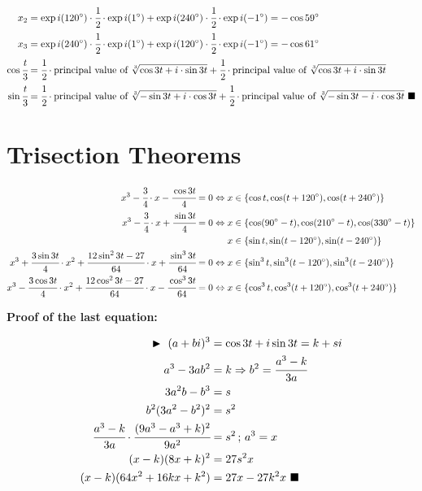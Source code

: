 \documentclass[11pt,a4paper]{article}
\begin{document}
\begin{align}
x_2 &= \exp i (120\degree) \cdot \cfrac{1}{2} \cdot \exp i (1\degree) + \exp i (240\degree) \cdot \cfrac{1}{2} \cdot \exp i (-1\degree) = - \cos 59\degree \\
x_3 &= \exp i (240\degree) \cdot \cfrac{1}{2} \cdot \exp i (1\degree) + \exp i (120\degree) \cdot \cfrac{1}{2} \cdot \exp i (-1\degree) = - \cos 61\degree \\
\cos \cfrac{t}{3} &= \cfrac{1}{2} \cdot \text{principal value of } \sqrt[3]{\cos 3t + i \cdot \sin 3t} + \cfrac{1}{2} \cdot \text{principal value of } \sqrt[3]{\cos 3t + i \cdot \sin 3t} \\
\sin \cfrac{t}{3} &= \cfrac{1}{2} \cdot \text{principal value of } \sqrt[3]{- \sin 3t + i \cdot \cos 3t} + \cfrac{1}{2} \cdot \text{principal value of } \sqrt[3]{- \sin 3t - i \cdot \cos 3t} \,\,\blacksquare
\end{align}

\vspace{3mm}

\section{Trisection Theorems}

\begin{align}
x^3 - \cfrac{3}{4} \cdot x - \cfrac{\cos 3t}{4} = 0 \Leftrightarrow x &\in \{ \cos t, \cos (t + 120\degree), \cos (t + 240\degree) \} \\
x^3 - \cfrac{3}{4} \cdot x + \cfrac{\sin 3t}{4} = 0 \Leftrightarrow x &\in \{ \cos (90\degree - t), \cos (210\degree - t), \cos (330\degree - t) \} \\
x &\in \{ \sin t, \sin (t - 120\degree), \sin (t - 240\degree) \} \\
x^3 + \cfrac{3 \sin 3t}{4} \cdot x^2 + \cfrac{12 \sin^2 3t - 27}{64} \cdot x + \cfrac{\sin^3 3t}{64} = 0 \Leftrightarrow x &\in \{ \sin^3 t, \sin^3 (t - 120\degree), \sin^3 (t - 240\degree) \} \\
x^3 - \cfrac{3 \cos 3t}{4} \cdot x^2 + \cfrac{12 \cos^2 3t - 27}{64} \cdot x - \cfrac{\cos^3 3t}{64} = 0 \Leftrightarrow x &\in \{ \cos^3 t, \cos^3 (t + 120\degree), \cos^3 (t + 240\degree) \}
\end{align}

\vspace{100mm}

\textbf{Proof of the last equation: }

\begin{align}
\blacktriangleright\,\,(a + bi)^3 &= \cos 3t + i \sin 3t = k + si \\
a^3 - 3ab^2 &= k \Rightarrow b^2 = \cfrac{a^3 - k}{3a} \\
3a^2b - b^3 &= s \\
b^2(3a^2 -b^2)^2 &= s^2 \\
\cfrac{a^3 - k}{3a} \cdot \cfrac{(9a^3 - a^3 + k)^2}{9a^2} &= s^2\,;\,a^3 = x \\
(x - k)(8x + k)^2 &= 27s^2 x \\
(x - k)(64x^2 + 16kx + k^2) &= 27x - 27k^2x\,\,\blacksquare
\end{align}
\end{document}
